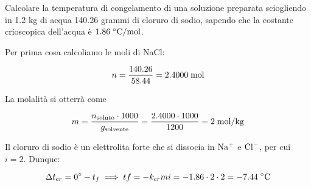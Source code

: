 \begin{esercizio}
    Calcolare la temperatura di congelamento di una soluzione preparata sciogliendo in 1.2 kg di acqua 140.26 grammi di cloruro di sodio, sapendo che la costante crioscopica dell'acqua è $1.86 \; ^{\circ} \rm C/mol$.
\end{esercizio}
\begin{soluzione}
    Per prima cosa calcoliamo le moli di NaCl:

$$n=\frac{140.26}{58.44}=2.4000 \; \rm mol$$

La molalità si otterrà come

$$m=\frac{n_{\rm soluto} \cdot 1000}{g_{\rm solvente}}
=\frac{2.4000 \cdot 1000}{1200}
=2 \; \rm mol/kg$$

Il cloruro di sodio è un elettrolita forte che si dissocia in $\rm Na^+$ e $\rm Cl^-$, per cui $i=2$. Dunque:

$$\Delta t_{cr}=0^{\circ} - t_f
\implies
tf=-k_{cr} m i= - 1.86 \cdot 2 \cdot 2=-7.44 \; \rm ^{\circ}C$$
\end{soluzione}

\newpage

